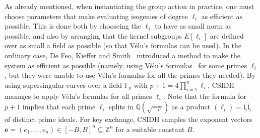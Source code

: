 \documentclass{llncs}
\newcommand{\F}{\mathbb{F}}
\newcommand{\OO}{\mathcal{O}}
\newcommand{\Q}{\mathbb{Q}}
\newcommand{\Z}{\mathbb{Z}}
\DeclareMathOperator{\Cl}{Cl}
\renewcommand{\l}{\mathfrak{l}}
\newcommand{\e}{\mathbf{e}}
\begin{document}
As already mentioned, when instantiating the group action in practice, one must choose parameters that make evaluating isogenies of degree $\ell_i$ as efficient as possible.
This is done both by chooseing the $\ell_i$ to have as small norm as possible, and also by arranging that the kernel subgroups $E[ \ell_i ]$ are defined over as small a field as possible (so that V\'elu's formulas can be used).
In the ordinary case, De Feo, Kieffer and Smith~\cite{DFKS18} introduced a method to make the system as efficient as possible (namely, using V\'elu's formulas~\cite{velu71} for some primes $\ell_i$, but they were unable to use V\'elu's formulas for all the primes they needed).
By using supersingular curves over a field $\F_p$ with $p+1 = 4\prod_{i=1}^n\ell_i$, CSIDH~\cite{CLMPR18} manages to apply V\'elu's formulas for all primes $\ell_i$.
Note that the formula for $p+1$ implies
that each prime $\ell_i$ splits in $\Q(\sqrt{-p})$ as a product $(\ell_i) = \l_i \bar{\l}_i$ of distinct prime ideals.
For key exchange, CSIDH samples the exponent vectors $\e = (e_1, \dots, e_n) \in [-B,B]^n \subseteq \Z^n$ for a suitable constant $B$.
\end{document}
